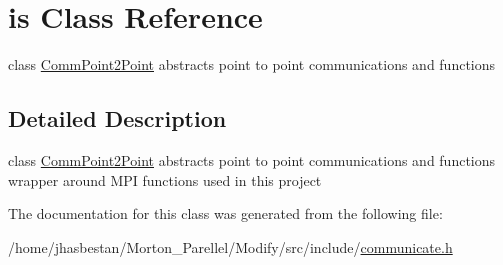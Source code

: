 \hypertarget{classis}{
\section{is Class Reference}
\label{classis}
}


class \hyperlink{classCommPoint2Point}{CommPoint2Point} abstracts point to point communications and functions  


\subsection{Detailed Description}
class \hyperlink{classCommPoint2Point}{CommPoint2Point} abstracts point to point communications and functions wrapper around MPI functions used in this project 

The documentation for this class was generated from the following file:\begin{DoxyCompactItemize}
\item 
/home/jhasbestan/Morton\_\-Parellel/Modify/src/include/\hyperlink{communicate_8h}{communicate.h}\end{DoxyCompactItemize}
